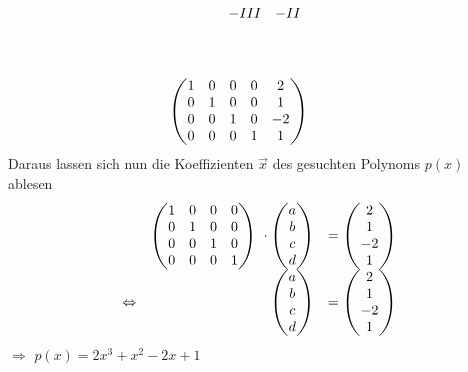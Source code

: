 \begin{align*}
\begin{array}{ c c }
		-III & -II\\
		& \\
		& \\
		& 
	\end{array}\\
	\begin{pmatrix}
		1 & 0 & 0 & 0 & 2\\
		0 & 1 & 0 & 0 & 1\\
		0 & 0 & 1 & 0 & -2\\
		0 & 0 & 0 & 1 & 1
	\end{pmatrix} & \begin{array}{ c c }
		& \\
		& \\
		& \\
		& 
	\end{array}
\end{align*}
Daraus lassen sich nun die Koeffizienten $\displaystyle \vec{x}$ des gesuchten Polynoms $\displaystyle p( x)$ ablesen
\begin{equation*}
	\begin{array}{ c r c }
		& \begin{pmatrix}
			1 & 0 & 0 & 0\\
			0 & 1 & 0 & 0\\
			0 & 0 & 1 & 0\\
			0 & 0 & 0 & 1
		\end{pmatrix} \ \cdot \begin{pmatrix}
			a\\
			b\\
			c\\
			d
		\end{pmatrix} & =\begin{pmatrix}
			2\\
			1\\
			-2\\
			1
		\end{pmatrix}\\
		\Leftrightarrow  & \begin{pmatrix}
			a\\
			b\\
			c\\
			d
		\end{pmatrix} & =\begin{pmatrix}
			2\\
			1\\
			-2\\
			1
		\end{pmatrix}
	\end{array}
\end{equation*}
$\displaystyle \Rightarrow $	$\displaystyle p( x) =2x^{3} +x^{2} -2x+1$